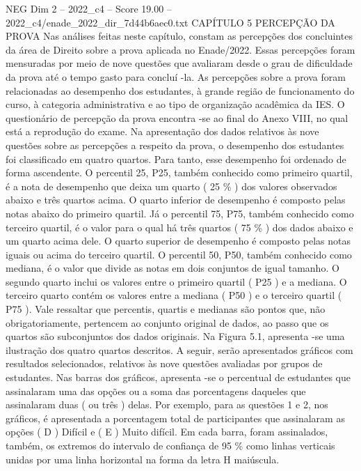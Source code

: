 \begin{textsample}{NEG Dim 2 – 2022\_c4 – Score 19.00 – 2022\_c4/enade\_2022\_dir\_7d44b6aec0.txt}  \label{ex:f2_neg_408}
CAPÍTULO 5 PERCEPÇÃO DA PROVA Nas análises feitas neste capítulo, constam as percepções dos concluintes da área de Direito sobre a prova aplicada no Enade/2022.
Essas percepções foram mensuradas por meio de nove questões que avaliaram desde o grau de dificuldade da prova até o tempo gasto para concluí -la.
As percepções sobre a prova foram relacionadas ao desempenho dos estudantes, à grande região de funcionamento do curso, à categoria administrativa e ao tipo de organização acadêmica da IES.
O questionário de percepção da prova encontra -se ao final do Anexo VIII, no qual está a reprodução do exame.
Na apresentação dos dados relativos às nove questões sobre as percepções a respeito da prova, o desempenho dos estudantes foi classificado em quatro quartos.
Para tanto, esse desempenho foi ordenado de forma ascendente.
O percentil 25, P25, também conhecido como primeiro quartil, é a nota de desempenho que deixa um quarto ( 25 \% ) dos valores observados abaixo e três quartos acima.
O quarto inferior de desempenho é composto pelas notas abaixo do primeiro quartil.
Já o percentil 75, P75, também conhecido como terceiro quartil, é o valor para o qual há três quartos ( 75 \% ) dos dados abaixo e um quarto acima dele.
O quarto superior de desempenho é composto pelas notas iguais ou acima do terceiro quartil.
O percentil 50, P50, também conhecido como mediana, é o valor que divide as notas em dois conjuntos de igual tamanho.
O segundo quarto inclui os valores entre o primeiro quartil ( P25 ) e a mediana.
O terceiro quarto contém os valores entre a mediana ( P50 ) e o terceiro quartil ( P75 ).
Vale ressaltar que percentis, quartis e medianas são pontos que, não obrigatoriamente, pertencem ao conjunto original de dados, ao passo que os quartos são subconjuntos dos dados originais.
Na Figura 5.1, apresenta -se uma ilustração dos quatro quartos descritos.
A seguir, serão apresentados gráficos com resultados selecionados, relativos às nove questões avaliadas por grupos de estudantes.
Nas barras dos gráficos, apresenta -se o percentual de estudantes que assinalaram uma das opções ou a soma das porcentagens daqueles que assinalaram duas ( ou três ) delas.
Por exemplo, para as questões 1 e 2, nos gráficos, é apresentada a porcentagem total de participantes que assinalaram as opções ( D ) Difícil e ( E ) Muito difícil.
Em cada barra, foram assinalados, também, os extremos do intervalo de confiança de 95 \% como linhas verticais unidas por uma linha horizontal na forma da letra H maiúscula.

\end{textsample}
